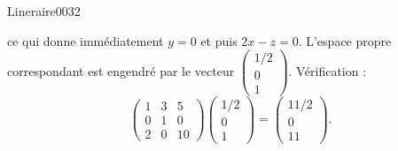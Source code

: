 \begin{corrige}{Lineraire0032}
\begin{enumerate}
	ce qui donne immédiatement $y=0$ et puis $2x-z=0$. L'espace propre correspondant est engendré par le vecteur $\begin{pmatrix}
		1/2	\\ 
		0	\\ 
		1	
	\end{pmatrix}$. Vérification :
	\begin{equation}
		\begin{pmatrix}
			1	&	3	&	5	\\
			0	&	1	&	0	\\
			2	&	0	&	10
		\end{pmatrix}\begin{pmatrix}
			1/2	\\ 
			0	\\ 
			1	
		\end{pmatrix}=\begin{pmatrix}
			11/2	\\ 
			0	\\ 
			11	
		\end{pmatrix}.
	\end{equation}

\end{enumerate}

\end{corrige}
